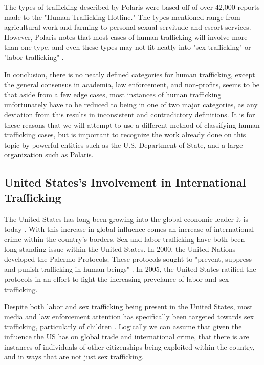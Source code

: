 \documentclass{article} %
\begin{document}
The types of trafficking described by Polaris were based off of over 42,000 reports made to the "Human Trafficking Hotline." The types mentioned range from agricultural work and farming to personal sexual servitude and escort services. However, Polaris notes that most cases of human trafficking will involve more than one type, and even these types may not fit neatly into "sex trafficking" or "labor trafficking" \parencite{polarisTypology}.

In conclusion, there is no neatly defined categories for human trafficking, except the general consensus in academia, law enforcement, and non-profits, seems to be that aside from a few edge cases, most instances of human trafficking unfortunately have to be reduced to being in one of two major categories, as any deviation from this results in inconsistent and contradictory definitions. It is for these reasons that we will attempt to use a different method of classifying human trafficking cases, but is important to recognize the work already done on this topic by powerful entities such as the U.S. Department of State, and a large organization such as Polaris.

\subsection*{United States's Involvement in International Trafficking}

The United States has long been growing into the global economic leader it is today \parencite{USEconPower}. With this increase in global influence comes an increase of international crime within the country's borders. Sex and labor trafficking have both been long-standing issue within the United States. In 2000, the United Nations developed the Palermo Protocols; These protocols sought to "prevent, suppress and punish trafficking in human beings" \parencite{Polermo}. In 2005, the United States ratified the protocols in an effort to fight the increasing prevelance of labor and sex trafficking. 

Despite both labor and sex trafficking being present in the United States, most media and law enforcement attention has specifically been targeted towards sex trafficking, particularly of children \parencite{MediaRep}. Logically we can assume that given the influence the US has on global trade and international crime, that there is are instances of individuals of other citizenships being exploited within the country, and in ways that are not just sex trafficking.
\end{document}
